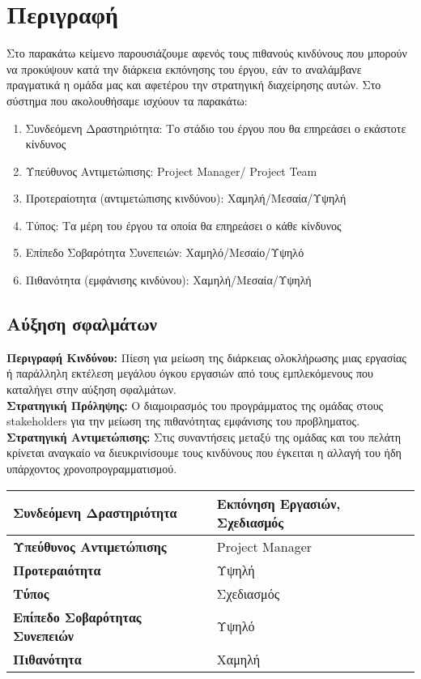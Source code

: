 \documentclass{article}
\newcommand\T{\rule{0pt}{2.6ex}}       %
\newcommand\B{\rule[-1.2ex]{0pt}{0pt}}
\begin{document}
\section{Περιγραφή}

Στο παρακάτω κείμενο παρουσιάζουμε αφενός τους πιθανούς κινδύνους που μπορούν να προκύψουν κατά την διάρκεια εκπόνησης του έργου, εάν το αναλάμβανε πραγματικά η ομάδα μας και αφετέρου την στρατηγική διαχείρησης αυτών. Στο σύστημα που ακολουθήσαμε ισχύουν τα παρακάτω:
\begin{enumerate}
    \item Συνδεόμενη Δραστηριότητα: Το στάδιο του έργου που θα επηρεάσει ο εκάστοτε κίνδυνος
    \item Υπεύθυνος Αντιμετώπισης: Project Manager/ Project Team
    \item Προτεραίοτητα (αντιμετώπισης κινδύνου): Χαμηλή/Μεσαία/Υψηλή
    \item Τύπος: Τα μέρη του έργου τα οποία θα επηρεάσει ο κάθε κίνδυνος
    \item Επίπεδο Σοβαρότητα Συνεπειών: Χαμηλό/Μεσαίο/Υψηλό
    \item Πιθανότητα (εμφάνισης κινδύνου): Χαμηλή/Μεσαία/Υψηλή
\end{enumerate}

\subsection{Αύξηση σφαλμάτων}

\textbf{Περιγραφή Κινδύνου:} Πίεση για μείωση της διάρκειας ολοκλήρωσης μιας εργασίας ή παράλληλη εκτέλεση  μεγάλου όγκου εργασιών από τους εμπλεκόμενους που καταλήγει στην αύξηση σφαλμάτων.\\

\textbf{Στρατηγική Πρόληψης:} Ο διαμοιρασμός του προγράμματος της ομάδας στους stakeholders για την μείωση της πιθανότητας εμφάνισης του προβληματος.\\

\textbf{Στρατηγική Αντιμετώπισης:} Στις συναντήσεις μεταξύ της ομάδας και του πελάτη κρίνεται αναγκαίο να διευκρινίσουμε τους κινδύνους που έγκειται η αλλαγή του ήδη υπάρχοντος χρονοπρογραμματισμού.\\
 
 \begin{center}
     \begin{tabular}{|l|l|}
     \hline
      \textbf{Συνδεόμενη Δραστηριότητα}   & Εκπόνηση Εργασιών, Σχεδιασμός \T\B \\ 
      \hline
      \textbf{Υπεύθυνος Αντιμετώπισης} & Project Manager \T\B \\
      \hline
      \textbf{Προτεραιότητα} & Υψηλή \T\B \\
      \hline
      \textbf{Τύπος} & Σχεδιασμός \T\B \\
      \hline
      \textbf{Επίπεδο Σοβαρότητας Συνεπειών} & Υψηλό \T\B \\
      \hline
      \textbf{Πιθανότητα} & Χαμηλή \T\B \\
      \hline
     \end{tabular}
 \end{center}
   
\end{document}
